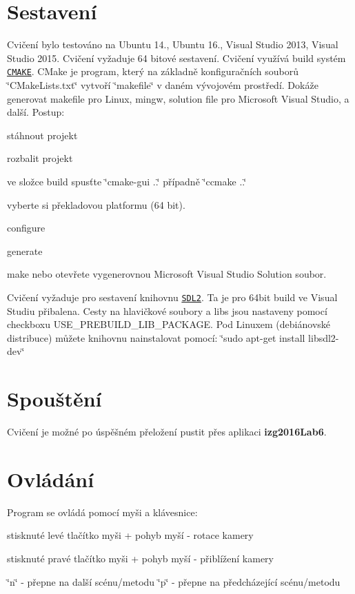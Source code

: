 \hypertarget{index_sestaveni}{}\section{Sestavení}\label{index_sestaveni}
Cvičení bylo testováno na Ubuntu 14., Ubuntu 16., Visual Studio 2013, Visual Studio 2015. Cvičení vyžaduje 64 bitové sestavení. Cvičení využívá build systém \href{https://cmake.org/}{\tt C\-M\-A\-K\-E}. C\-Make je program, který na základně konfiguračních souborů \char`\"{}\-C\-Make\-Lists.\-txt\char`\"{} vytvoří \char`\"{}makefile\char`\"{} v daném vývojovém prostředí. Dokáže generovat makefile pro Linux, mingw, solution file pro Microsoft Visual Studio, a další. Postup\-:
\begin{DoxyEnumerate}
\item stáhnout projekt
\item rozbalit projekt
\item ve složce build spusťte \char`\"{}cmake-\/gui ..\char`\"{} případně \char`\"{}ccmake ..\char`\"{}
\item vyberte si překladovou platformu (64 bit).
\item configure
\item generate
\item make nebo otevřete vygenerovnou Microsoft Visual Studio Solution soubor.
\end{DoxyEnumerate}

Cvičení vyžaduje pro sestavení knihovnu \href{https://www.libsdl.org/download-2.0.php}{\tt S\-D\-L2}. Ta je pro 64bit build ve Visual Studiu přibalena. Cesty na hlavičkové soubory a libs jsou nastaveny pomocí checkboxu U\-S\-E\-\_\-\-P\-R\-E\-B\-U\-I\-L\-D\-\_\-\-L\-I\-B\-\_\-\-P\-A\-C\-K\-A\-G\-E. Pod Linuxem (debiánovské distribuce) můžete knihovnu nainstalovat pomocí\-: \char`\"{}sudo apt-\/get install libsdl2-\/dev\char`\"{}\hypertarget{index_spousteni}{}\section{Spouštění}\label{index_spousteni}
Cvičení je možné po úspěšném přeložení pustit přes aplikaci {\bfseries izg2016\-Lab6}.\hypertarget{index_ovladani}{}\section{Ovládání}\label{index_ovladani}
Program se ovládá pomocí myši a klávesnice\-:
\begin{DoxyItemize}
\item stisknuté levé tlačítko myši + pohyb myší -\/ rotace kamery
\item stisknuté pravé tlačítko myši + pohyb myší -\/ přiblížení kamery
\item \char`\"{}n\char`\"{} -\/ přepne na další scénu/metodu \char`\"{}p\char`\"{} -\/ přepne na předcházející scénu/metodu 
\end{DoxyItemize}